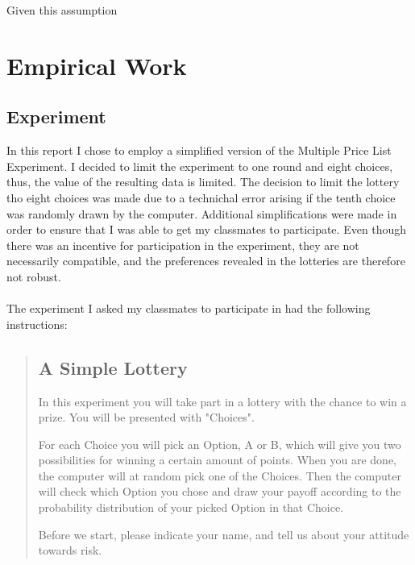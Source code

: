 \documentclass [12pt,a4paper,oneside]{article}
\begin{document}
Given this assumption





\section{Empirical Work}

\subsection{Experiment}
In this report I chose to employ a simplified version of the \textcite{holt_risk_2002} Multiple Price List Experiment. I decided to limit the experiment to one round and eight choices, thus, the value of the resulting data is limited. The decision to limit the lottery tho eight choices was made due to a technichal error arising if the tenth choice was randomly drawn by the computer. 
Additional simplifications were made in order to ensure that I was able to get my classmates to participate. 
Even though there was an incentive for participation in the experiment, they are not necessarily compatible, and the preferences revealed in the lotteries are therefore not robust. 

\paragraph{}
The experiment I asked my classmates to participate in had the following instructions:

\begin{quotation}
  
\subsection*{A Simple Lottery}
In this experiment you will take part in a lottery with the chance to win a prize. You will be presented with "Choices".

For each Choice you will pick an Option, A or B, which will give you two possibilities for winning a certain amount of points. When you are done, the computer will at random pick one of the Choices. Then the computer will check which Option you chose and draw your payoff according to the probability distribution of your picked Option in that Choice.

Before we start, please indicate your name, and tell us about your attitude towards risk.
\end{quotation}
\end{document}
